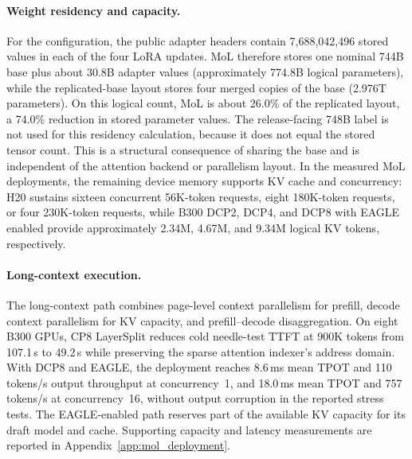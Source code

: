 \paragraph{Weight residency and capacity.}
For the \venti{} configuration, the public adapter headers contain
7,688,042,496 stored values in each of the four LoRA updates. MoL therefore
stores one nominal 744B base plus about 30.8B adapter values (approximately
774.8B logical parameters), while the replicated-base layout stores four
merged copies of the base (2.976T parameters). On this logical count, MoL is
about 26.0\% of the replicated layout, a 74.0\% reduction in stored parameter
values. The release-facing 748B label is not used for this
residency calculation, because it does not equal the stored tensor count.
This is a structural consequence of sharing the base and is independent of the
attention backend or parallelism layout. In the measured MoL deployments, the
remaining device memory supports KV cache and concurrency: H20 sustains sixteen
concurrent 56K-token requests, eight 180K-token requests, or four 230K-token
requests, while B300 DCP2, DCP4, and DCP8 with EAGLE enabled provide
approximately 2.34M, 4.67M, and 9.34M logical KV tokens, respectively.

\paragraph{Long-context execution.}
The long-context path combines page-level context parallelism for prefill,
decode context parallelism for KV capacity, and prefill--decode disaggregation.
On eight B300 GPUs, CP8 LayerSplit reduces cold needle-test TTFT at 900K tokens
from 107.1\,s to 49.2\,s while preserving the sparse attention indexer's
address domain. With DCP8 and EAGLE, the deployment reaches
8.6\,ms mean TPOT and 110 tokens/s output throughput at concurrency~1, and
18.0\,ms mean TPOT and 757 tokens/s at concurrency~16, without output
corruption in the reported stress tests. The EAGLE-enabled path reserves part
of the available KV capacity for its draft model and cache. Supporting capacity
and latency measurements are reported in Appendix~\ref{app:mol_deployment}.

